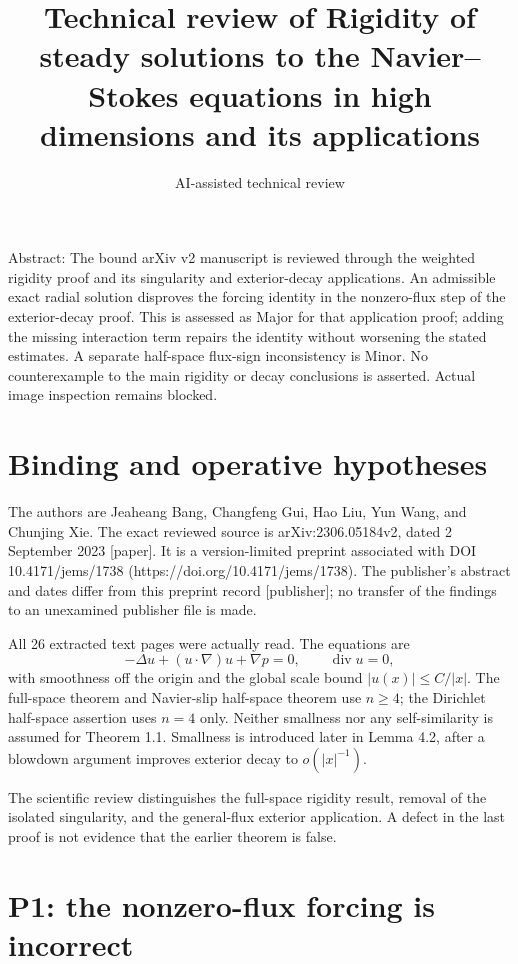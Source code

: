 \documentclass[10pt]{article}
\title{Technical review of Rigidity of steady solutions to the Navier–Stokes equations in high dimensions and its applications}
\author{AI-assisted technical review}
\date{}
\begin{document}
\maketitle
Abstract: The bound arXiv v2 manuscript is reviewed through the weighted rigidity proof and its singularity and exterior-decay applications. An admissible exact radial solution disproves the forcing identity in the nonzero-flux step of the exterior-decay proof. This is assessed as Major for that application proof; adding the missing interaction term repairs the identity without worsening the stated estimates. A separate half-space flux-sign inconsistency is Minor. No counterexample to the main rigidity or decay conclusions is asserted. Actual image inspection remains blocked.\par
\section*{Binding and operative hypotheses}
The authors are Jeaheang Bang, Changfeng Gui, Hao Liu, Yun Wang, and Chunjing Xie. The exact reviewed source is arXiv:2306.05184v2, dated 2 September 2023 [paper]. It is a version-limited preprint associated with DOI 10.4171/jems/1738 (https://doi.org/10.4171/jems/1738). The publisher’s abstract and dates differ from this preprint record [publisher]; no transfer of the findings to an unexamined publisher file is made.\par
All 26 extracted text pages were actually read. The equations are \[-\Delta u+(u\cdot\nabla)u+\nabla p=0,\qquad \operatorname{div}u=0,\] with smoothness off the origin and the global scale bound \(|u(x)|\leq C/|x|\). The full-space theorem and Navier-slip half-space theorem use \(n\geq4\); the Dirichlet half-space assertion uses \(n=4\) only. Neither smallness nor any self-similarity is assumed for Theorem 1.1. Smallness is introduced later in Lemma 4.2, after a blowdown argument improves exterior decay to \(o(|x|^{-1})\).\par
The scientific review distinguishes the full-space rigidity result, removal of the isolated singularity, and the general-flux exterior application. A defect in the last proof is not evidence that the earlier theorem is false.\par
\section*{P1: the nonzero-flux forcing is incorrect}
\end{document}
